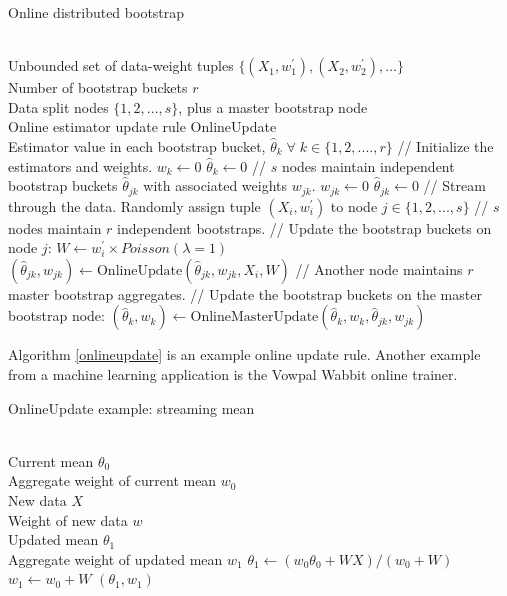 \documentclass{article}
\begin{document}
\begin{algorithm}
\caption{Online distributed bootstrap}
\label{onlineblb}
\begin{algorithmic}[1]
\Require \\
Unbounded set of data-weight tuples $\{(X_1,w^{\prime}_1), (X_2,w^{\prime}_2), ...\}$\\
Number of bootstrap buckets $r$\\
Data split nodes $\{1,2, ..., s\}$, plus a master bootstrap node\\
Online estimator update rule OnlineUpdate
\Ensure \\
Estimator value in each bootstrap bucket, $\hat\theta_{k}\;\forall \; k\in \{1, 2, ...., r\}$
\State // Initialize the estimators and weights.
\State $w_{k} \gets 0$
\State $\hat\theta_{k} \gets 0$
\State // $s$ nodes maintain independent bootstrap buckets $\hat\theta_{jk}$ with associated weights $w_{jk}$.
\State $w_{jk} \gets 0$
\State $\hat\theta_{jk} \gets 0$
\EndFor
\EndFor
\State // Stream through the data.
\State Randomly assign tuple $(X_i,w^{\prime}_i)$ to node $j \in \{1, 2, ..., s\}$
\State // $s$ nodes maintain $r$ independent bootstraps.
\State // Update the bootstrap buckets on node $j$:
\State $W \gets w^{\prime}_i \times Poisson(\lambda = 1)$
\State $(\hat\theta_{jk}, w_{jk}) \gets \mathrm{OnlineUpdate}(\hat\theta_{jk}, w_{jk}, X_i, W)$
\EndFor
\State // Another node maintains $r$ master bootstrap aggregates.
\State // Update the bootstrap buckets on the master bootstrap node:
\State $(\hat\theta_{k}, w_{k}) \gets \mathrm{OnlineMasterUpdate}(\hat\theta_{k}, w_{k},\hat\theta_{jk}, w_{jk})$
\EndFor
\EndFor
\EndProcedure
\end{algorithmic}
\end{algorithm}

Algorithm \ref{onlineupdate} is an example online update rule. Another example
from a machine learning application is the Vowpal Wabbit online trainer.

\begin{algorithm}
\caption{OnlineUpdate example: streaming mean}
\label{onlineupdate}
\begin{algorithmic}[1]
\Require \\
Current mean $\theta_0$ \\
Aggregate weight of current mean $w_0$ \\
New data $X$ \\
Weight of new data $w$
\Ensure \\
Updated mean $\theta_1$ \\
Aggregate weight of updated mean $w_1$
\State $\theta_1 \gets (w_0\theta_0 + WX)/(w_0 + W)$
\State $w_1 \gets w_0 + W$ 
\State \Return $(\theta_1, w_1)$
\EndProcedure
\end{algorithmic}
\end{algorithm}
\end{document}
